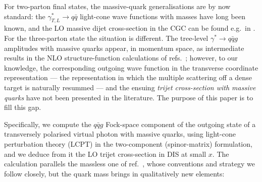 \documentclass[11pt,a4paper]{article}
\numberwithin{equation}{section}
\begin{document}
For two-parton final states, the massive-quark generalisations are by now standard: the
$\gamma^*_{T,L}\to q\bar q$ light-cone wave functions with masses have long been known, and the
LO massive dijet cross-section in the CGC can be found e.g.\ in \cite{Dominguez:2011wm}. For
the three-parton state the situation is different. The tree-level $\gamma^*\to q\bar qg$
amplitudes with massive quarks appear, in momentum space, as intermediate results in the NLO
structure-function calculations of refs.~\cite{Beuf:2021qqa,Beuf:2022ndu}; however, to our
knowledge, the corresponding outgoing wave function in the transverse coordinate
representation --- the representation in which the multiple scattering off a dense target is
naturally resummed --- and the ensuing \emph{trijet cross-section with massive quarks} have not
been presented in the literature. The purpose of this paper is to fill this gap.

Specifically, we compute the $q\bar qg$ Fock-space component of the outgoing state of a
transversely polarised virtual photon with massive quarks, using light-cone perturbation theory
(LCPT) \cite{Kogut:1969xa,Lepage:1980fj,Brodsky:1997de} in the two-component (spinor-matrix)
formulation, and we deduce from it the LO trijet cross-section in DIS at small $x$. The
calculation parallels the massless one of ref.~\cite{Iancu:2022gpw}, whose conventions and
strategy we follow closely, but the quark mass brings in qualitatively new elements:
\end{document}

